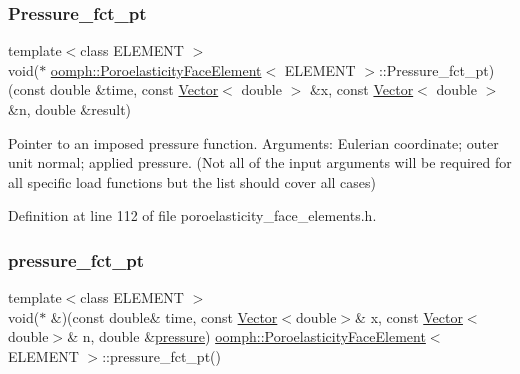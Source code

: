 \subsubsection{\texorpdfstring{Pressure\+\_\+fct\+\_\+pt}{Pressure\_fct\_pt}}
{\footnotesize\ttfamily template$<$class E\+L\+E\+M\+E\+NT $>$ \\
void($\ast$ \hyperlink{classoomph_1_1PoroelasticityFaceElement}{oomph\+::\+Poroelasticity\+Face\+Element}$<$ E\+L\+E\+M\+E\+NT $>$\+::Pressure\+\_\+fct\+\_\+pt) (const double \&time, const \hyperlink{classoomph_1_1Vector}{Vector}$<$ double $>$ \&x, const \hyperlink{classoomph_1_1Vector}{Vector}$<$ double $>$ \&n, double \&result)\hspace{0.3cm}{\ttfamily [protected]}}



Pointer to an imposed pressure function. Arguments\+: Eulerian coordinate; outer unit normal; applied pressure. (Not all of the input arguments will be required for all specific load functions but the list should cover all cases) 



Definition at line 112 of file poroelasticity\+\_\+face\+\_\+elements.\+h.

\mbox{\label{classoomph_1_1PoroelasticityFaceElement_af2e65648f0bd2ebcdef444d47bad6861}} 
\subsubsection{\texorpdfstring{pressure\+\_\+fct\+\_\+pt}{pressure\_fct\_pt}}
{\footnotesize\ttfamily template$<$class E\+L\+E\+M\+E\+NT $>$ \\
void($\ast$ \&)(const double\& time, const \hyperlink{classoomph_1_1Vector}{Vector}$<$double$>$\& x, const \hyperlink{classoomph_1_1Vector}{Vector}$<$double$>$\& n, double \&\hyperlink{classoomph_1_1PoroelasticityFaceElement_af0ecc8b5c372d479f9ba46892a21e955}{pressure}) \hyperlink{classoomph_1_1PoroelasticityFaceElement}{oomph\+::\+Poroelasticity\+Face\+Element}$<$ E\+L\+E\+M\+E\+NT $>$\+::pressure\+\_\+fct\+\_\+pt()\hspace{0.3cm}{\ttfamily [inline]}}



